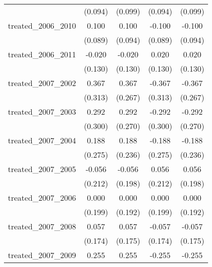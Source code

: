 {\begin{tabular}{l*{4}{c}}
            &     (0.094)         &     (0.099)         &     (0.094)         &     (0.099)         \\
[1em]
treated\_2006\_2010&       0.100         &       0.100         &      -0.100         &      -0.100         \\
            &     (0.089)         &     (0.094)         &     (0.089)         &     (0.094)         \\
[1em]
treated\_2006\_2011&      -0.020         &      -0.020         &       0.020         &       0.020         \\
            &     (0.130)         &     (0.130)         &     (0.130)         &     (0.130)         \\
[1em]
treated\_2007\_2002&       0.367         &       0.367         &      -0.367         &      -0.367         \\
            &     (0.313)         &     (0.267)         &     (0.313)         &     (0.267)         \\
[1em]
treated\_2007\_2003&       0.292         &       0.292         &      -0.292         &      -0.292         \\
            &     (0.300)         &     (0.270)         &     (0.300)         &     (0.270)         \\
[1em]
treated\_2007\_2004&       0.188         &       0.188         &      -0.188         &      -0.188         \\
            &     (0.275)         &     (0.236)         &     (0.275)         &     (0.236)         \\
[1em]
treated\_2007\_2005&      -0.056         &      -0.056         &       0.056         &       0.056         \\
            &     (0.212)         &     (0.198)         &     (0.212)         &     (0.198)         \\
[1em]
treated\_2007\_2006&       0.000         &       0.000         &       0.000         &       0.000         \\
            &     (0.199)         &     (0.192)         &     (0.199)         &     (0.192)         \\
[1em]
treated\_2007\_2008&       0.057         &       0.057         &      -0.057         &      -0.057         \\
            &     (0.174)         &     (0.175)         &     (0.174)         &     (0.175)         \\
[1em]
treated\_2007\_2009&       0.255         &       0.255         &      -0.255         &      -0.255         \\

\end{tabular}}
